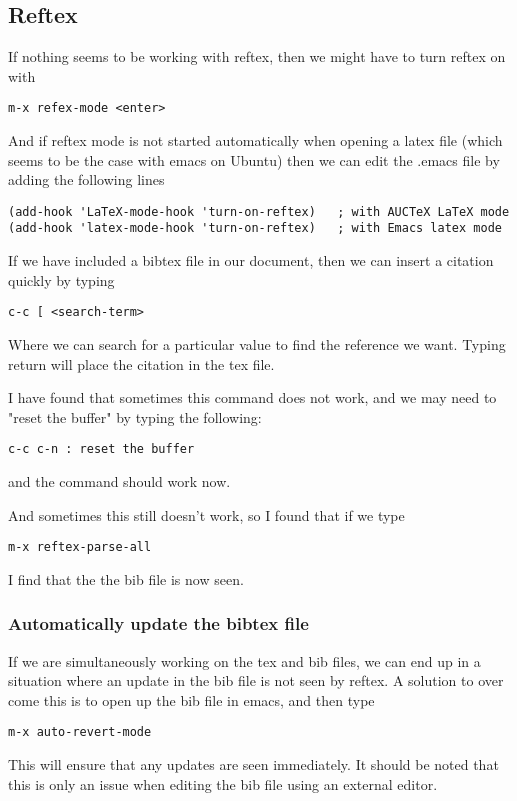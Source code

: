 \documentclass[a4paper, 10pt]{article}
\begin{document}
\subsection*{Reftex}

If nothing seems to be working with reftex, then we might have to turn
reftex on with 
\begin{verbatim}
m-x refex-mode <enter>
\end{verbatim}
And if reftex mode is not started automatically when opening a latex
file (which seems to be the case with emacs on Ubuntu) then we can
edit the .emacs file by adding the following lines
\begin{verbatim}
(add-hook 'LaTeX-mode-hook 'turn-on-reftex)   ; with AUCTeX LaTeX mode
(add-hook 'latex-mode-hook 'turn-on-reftex)   ; with Emacs latex mode
\end{verbatim}
If we have included a bibtex file in our document, then we can insert a citation quickly by typing
\begin{verbatim}
c-c [ <search-term>
\end{verbatim}
Where we can search for a particular value to find the reference we want. Typing return will place the citation in the tex file.
  
I have found that sometimes this command does not work, and we may
need to "reset the buffer" by typing the following:
\begin{verbatim}
c-c c-n : reset the buffer
\end{verbatim}
and the command should work now.

And sometimes this still doesn't work, so I found that if we type
\begin{verbatim}
m-x reftex-parse-all
\end{verbatim}
I find that the the bib file is now seen.


\subsubsection*{Automatically update the bibtex file}
\label{sec:autom-update-bibt}

If we are simultaneously working on the tex and bib files, we can end
up in a situation where an update in the bib file is not seen by
reftex. A solution to over come this is to open up the bib file in
emacs, and then type 
\begin{verbatim}
m-x auto-revert-mode
\end{verbatim}
This will ensure that any updates are seen immediately. It should be
noted that this is only an issue when editing the bib file using an
external editor. 
\end{document}
